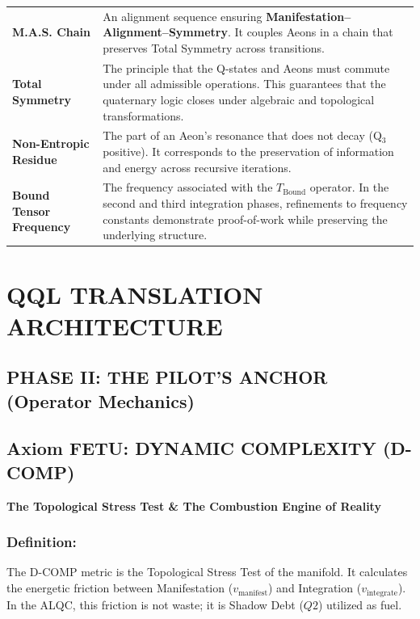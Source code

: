 \documentclass[11pt, letterpaper]{article}
\newcommand{\FETU}{\ensuremath{\mathop{\textnormal{\thaanafont\symbol{"23E3}}}}}   %
\def\FETU{FETU}%
\begin{document}
\begin{center}
\begin{longtable}{p{3.5cm} p{11.5cm}}
\textbf{M.A.S. Chain} & An alignment sequence ensuring \textbf{Manifestation--Alignment--Symmetry}. It couples Aeons in a chain that preserves Total Symmetry across transitions. \\
\addlinespace[1ex]

\textbf{Total Symmetry} & The principle that the Q-states and Aeons must commute under all admissible operations. This guarantees that the quaternary logic closes under algebraic and topological transformations. \\
\addlinespace[1ex]

\textbf{Non-Entropic Residue} & The part of an Aeon's resonance that does not decay (Q$_3$ positive). It corresponds to the preservation of information and energy across recursive iterations. \\
\addlinespace[1ex]

\textbf{Bound Tensor Frequency} & The frequency associated with the $T_{\text{Bound}}$ operator. In the second and third integration phases, refinements to frequency constants demonstrate proof-of-work while preserving the underlying structure. \\

\bottomrule
\end{longtable}
\end{center}

\newpage
\section{QQL TRANSLATION ARCHITECTURE}\label{sec:partIII}
\subsection{PHASE II: THE PILOT'S ANCHOR (Operator Mechanics)}

\subsection*{Axiom \FETU: DYNAMIC COMPLEXITY (D-COMP)}\label{sec:part1}
\textbf{The Topological Stress Test \& The Combustion Engine of Reality}    

\subsubsection{Definition:}\label{sec:part1.1}

The D-COMP metric is the Topological Stress Test of the manifold. It calculates the energetic friction between Manifestation ($v_{\text{manifest}}$) and Integration ($v_{\text{integrate}}$). In the ALQC, this friction is not waste; it is Shadow Debt ($Q2$) utilized as fuel.
\end{document}
